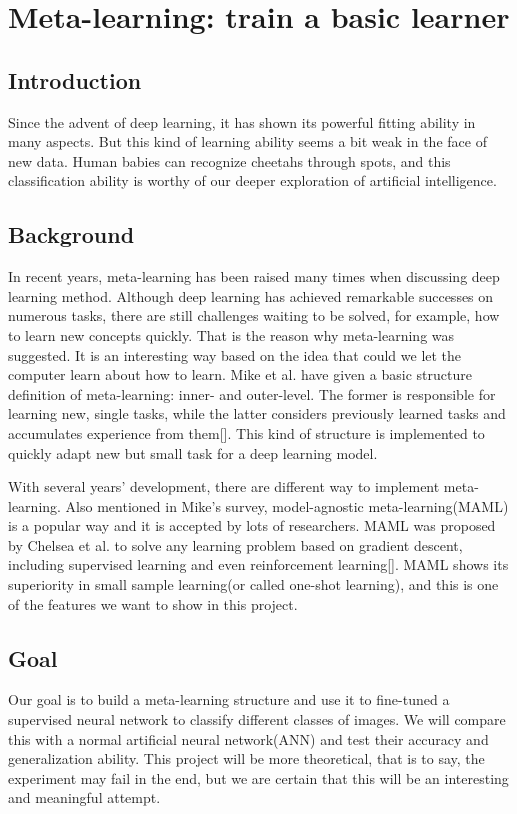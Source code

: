 \documentclass[../proposal.tex]{subfiles}
\begin{document}
\section{Meta-learning: train a basic learner}
\subsection{Introduction}
Since the advent of deep learning, it has shown its powerful fitting ability in many aspects. But this kind of learning ability seems a bit weak in the face of new data. Human babies can recognize cheetahs through spots, and this classification ability is worthy of our deeper exploration of artificial intelligence.


\subsection{Background}
In recent years, meta-learning has been raised many times when discussing deep learning method. Although deep learning has achieved remarkable successes on numerous tasks, there are still challenges waiting to be solved, for example, how to learn new concepts quickly. That is the reason why meta-learning was suggested. It is an interesting way based on the idea that could we let the computer learn about how to learn. Mike et al. have given a basic structure definition of meta-learning: inner- and outer-level. The former is responsible for learning new, single tasks, while the latter considers previously learned tasks and accumulates experience from them[\cite{huisman2020survey}]. This kind of structure is implemented to quickly adapt new but small task for a deep learning model.

With several years' development, there are different way to implement meta-learning. Also mentioned in Mike's survey, model-agnostic meta-learning(MAML) is a popular way and it is accepted by lots of researchers. MAML was proposed by Chelsea et al. to solve any learning problem based on gradient descent, including supervised learning and even reinforcement learning[\cite{finn2017model}]. MAML shows its superiority in small sample learning(or called one-shot learning), and this is one of the features we want to show in this project.

\subsection{Goal}
Our goal is to build a meta-learning structure and use it to fine-tuned a supervised neural network to classify different classes of images. We will compare this with a normal artificial neural network(ANN) and test their accuracy and generalization ability. This project will be more theoretical, that is to say, the experiment may fail in the end, but we are certain that this will be an interesting and meaningful attempt.
\end{document}
